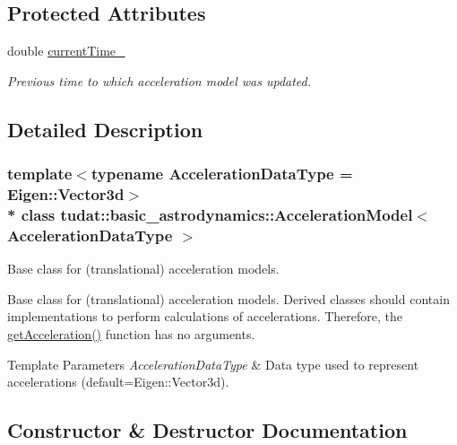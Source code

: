 \subsection*{Protected Attributes}
\begin{DoxyCompactItemize}
\item 
double \hyperlink{classtudat_1_1basic__astrodynamics_1_1AccelerationModel_a70f6593c9eec30136ed648ca0e6c9e88}{current\+Time\+\_\+}\hypertarget{classtudat_1_1basic__astrodynamics_1_1AccelerationModel_a70f6593c9eec30136ed648ca0e6c9e88}{}\label{classtudat_1_1basic__astrodynamics_1_1AccelerationModel_a70f6593c9eec30136ed648ca0e6c9e88}

\begin{DoxyCompactList}\small\item\em Previous time to which acceleration model was updated. \end{DoxyCompactList}\end{DoxyCompactItemize}


\subsection{Detailed Description}
\subsubsection*{template$<$typename Acceleration\+Data\+Type = Eigen\+::\+Vector3d$>$\\*
class tudat\+::basic\+\_\+astrodynamics\+::\+Acceleration\+Model$<$ Acceleration\+Data\+Type $>$}

Base class for (translational) acceleration models. 

Base class for (translational) acceleration models. Derived classes should contain implementations to perform calculations of accelerations. Therefore, the \hyperlink{classtudat_1_1basic__astrodynamics_1_1AccelerationModel_a1f59960bc477fc02e7d52697ced99750}{get\+Acceleration()} function has no arguments. 
\begin{DoxyTemplParams}{Template Parameters}
{\em Acceleration\+Data\+Type} & Data type used to represent accelerations (default=Eigen\+::\+Vector3d). \\
\hline
\end{DoxyTemplParams}


\subsection{Constructor \& Destructor Documentation}
